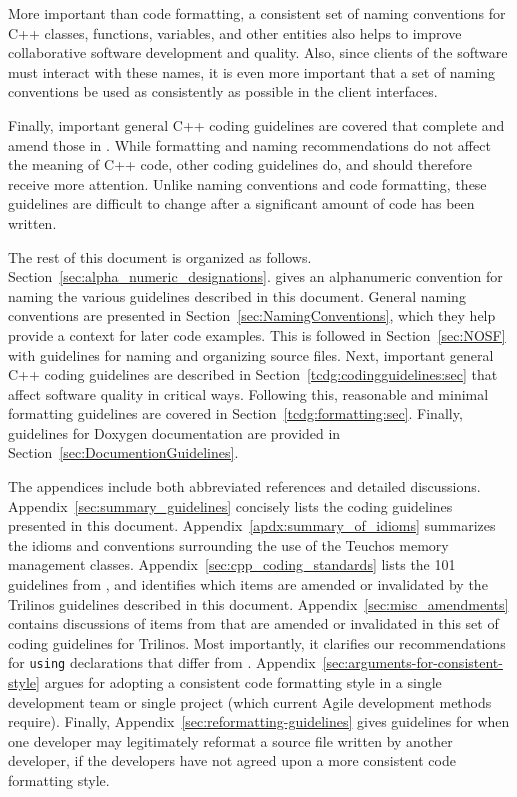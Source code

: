 More important than code formatting, a consistent set of naming
conventions for C++ classes, functions, variables, and other entities
also helps to improve collaborative software development and quality.
Also, since clients of the software must interact with these names, it
is even more important that a set of naming conventions be used as
consistently as possible in the client interfaces.

Finally, important general C++ coding guidelines are covered that
complete and amend those in {}\cite{C++CodingStandards05}.  While
formatting and naming recommendations do not affect the meaning of C++
code, other coding guidelines do, and should therefore receive more
attention.  Unlike naming conventions and code formatting, these
guidelines are difficult to change after a significant amount of code
has been written.

The rest of this document is organized as follows.
Section~\ref{sec:alpha_numeric_designations}.  gives an alphanumeric
convention for naming the various guidelines described in this
document.  General naming conventions are presented in
Section~\ref{sec:NamingConventions}, which they help provide a context
for later code examples.  This is followed in Section~\ref{sec:NOSF}
with guidelines for naming and organizing source files.  Next,
important general C++ coding guidelines are described in
Section~\ref{tcdg:codingguidelines:sec} that affect software quality
in critical ways.  Following this, reasonable and minimal formatting
guidelines are covered in Section~\ref{tcdg:formatting:sec}.  Finally,
guidelines for Doxygen documentation are provided in
Section~\ref{sec:DocumentionGuidelines}.

The appendices include both abbreviated references and detailed
discussions.  Appendix~\ref{sec:summary_guidelines} concisely lists
the coding guidelines presented in this document.
Appendix~\ref{apdx:summary_of_idioms} summarizes the idioms and
conventions surrounding the use of the Teuchos memory management
classes.  Appendix~\ref{sec:cpp_coding_standards} lists the 101
guidelines from {}\cite{C++CodingStandards05}, and identifies which
items are amended or invalidated by the Trilinos guidelines described
in this document.  Appendix~\ref{sec:misc_amendments} contains
discussions of items from {}\cite{C++CodingStandards05} that are
amended or invalidated in this set of coding guidelines for Trilinos.
Most importantly, it clarifies our recommendations for
{}\texttt{using} declarations that differ from {}\cite[Item
59]{C++CodingStandards05}.
Appendix~\ref{sec:arguments-for-consistent-style} argues for adopting
a consistent code formatting style in a single development team or
single project (which current Agile development methods require).
Finally, Appendix~\ref{sec:reformatting-guidelines} gives guidelines
for when one developer may legitimately reformat a source file written
by another developer, if the developers have not agreed upon a more
consistent code formatting style.


